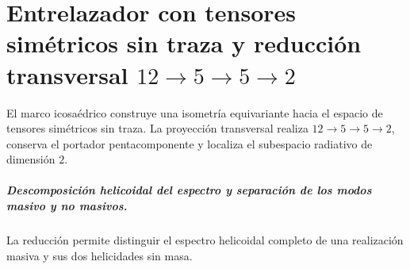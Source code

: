 \chapter{Entrelazador con tensores simétricos sin traza y reducción transversal \texorpdfstring{\(12\to5\to5\to2\)}{12→5→5→2}}
\label{chap:parte-iv-64}

El marco icosaédrico construye una isometría equivariante hacia el espacio de tensores simétricos sin traza. La proyección transversal realiza \(12\to5\to5\to2\), conserva el portador pentacomponente y localiza el subespacio radiativo de dimensión \(2\).



\paragraph{Descomposición helicoidal del espectro y separación de los modos masivo y no masivos.} La reducción permite distinguir el espectro helicoidal completo de una realización masiva y sus dos helicidades sin masa.
